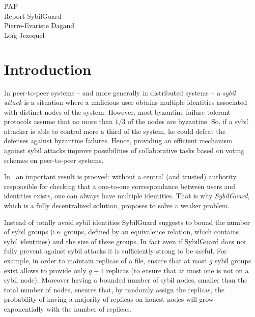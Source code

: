 \documentclass[a4paper,11pt]{article}
\begin{document}
\begin{center} 
  {\Large PAP \\ Report SybilGuard}\\
  Pierre-Evariste {\sc Dagand} \\
  Loïg {\sc Jezequel}
\end{center}

\section*{Introduction}


In peer-to-peer systems -- and more generally in distributed systems
-- a \emph{sybil attack} is a situation where a malicious user obtains
multiple identities associated with distinct nodes of the system.
However, most byzantine failure tolerant protocols assume that no more
than $1/3$ of the nodes are byzantine.  So, if a sybil attacker is
able to control more a third of the system, he could defeat the
defenses against byzantine failures.  Hence, providing an efficient
mechanism against sybil attacks improve possibilities of collaborative
tasks based on voting schemes on peer-to-peer systems.


In~\cite{douceur} an important result is prooved: without a central
(and trusted) authority responsible for checking that a one-to-one
correspondance between users and identities exists, one can always
have multiple identities.  That is why \emph{SybilGuard}, which is a
fully decentralized solution, proposes to solve a weaker problem.


Instead of totally avoid sybil identities SybilGuard suggests to bound
the number of sybil groups (i.e. groups, defined by an equivalence
relation, which contains sybil identities) and the size of these
groups.  In fact even if SybilGuard does not fully prevent against
sybil attacks it is sufficiently strong to be useful.  For example, in
order to maintain replicas of a file, ensure that at most $g$ sybil
groups exist allows to provide only $g+1$ replicas (to ensure that at
most one is not on a sybil node).  Moreover having a bounded number of
sybil nodes, smaller than the total number of nodes, ensures that, by
randomly assign the replicas, the probability of having a majority of
replicas on honest nodes will grow exponentially with the number of
replicas.
\end{document}
